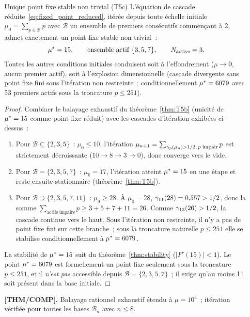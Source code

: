 \documentclass[12pt,a4paper]{article}
\begin{document}
\begin{thmbox}{Unique point fixe stable non trivial (T5c)}
\label{thm:T5c}
L'équation de cascade réduite~\eqref{eq:fixed_point_reduced}, itérée
depuis toute échelle initiale $\mu_0 = \sum_{p \in \mathcal{B}} p$
avec $\mathcal{B}$ un ensemble de premiers consécutifs commençant
à $2$, admet exactement un point fixe stable non trivial~:
\begin{equation}
  {\mu^{*}} = 15, \qquad
  \text{ensemble actif } \{3, 5, 7\}, \qquad
  N_{\rm active} = 3.
  \label{eq:unique_stable}
\end{equation}
Toutes les autres conditions initiales conduisent soit à
l'effondrement ($\mu \to 0$, aucun premier actif), soit à
l'explosion dimensionnelle (cascade divergente sans point fixe fini
sous l'itération non restreinte~; conditionnellement
${\mu^{*}} = 6079$ avec 53 premiers actifs sous la troncature
$p \leq 251$).

\begin{proof}
Combiner le balayage exhaustif du théorème~\ref{thm:T5b} (unicité de
${\mu^{*}} = 15$ comme point fixe réduit) avec les cascades d'itération
exhibées ci-dessus~:
\begin{enumerate}[nosep]
\item Pour $\mathcal{B} \subseteq \{2,3,5\}$~: $\mu_0 \leq 10$,
  l'itération
  $\mu_{n+1} = \sum_{\gamma_{p}(\mu_n) > 1/2,\, p \text{ impair}} p$
  est strictement décroissante ($10 \to 8 \to 3 \to 0$), donc
  converge vers le vide.
\item Pour $\mathcal{B} = \{2,3,5,7\}$~: $\mu_0 = 17$, l'itération
  atteint ${\mu^{*}} = 15$ en une étape et reste ensuite stationnaire
  (théorème~\ref{thm:T5b}).
\item Pour $\mathcal{B} \supseteq \{2,3,5,7,11\}$~: $\mu_0 \geq 28$.
  À $\mu_0 = 28$, $\gamma_{11}(28) = 0{,}557 > 1/2$, donc la somme
  $\sum_{\text{actifs impairs}} p \geq 3 + 5 + 7 + 11 = 26$. Comme
  $\gamma_{13}(26) > 1/2$, la cascade continue vers le haut. Sous
  l'itération non restreinte, il n'y a pas de point fixe fini sur
  cette branche~; sous la troncature naturelle $p \leq 251$ elle
  se stabilise conditionnellement à ${\mu^{*}} = 6079$.
\end{enumerate}
La stabilité de ${\mu^{*}} = 15$ suit du théorème~\ref{thm:stability}
($|F'(15)| < 1$). Le point ${\mu^{*}} = 6079$ est formellement un
point fixe seulement sous la troncature $p \leq 251$, et il \emph{n'est
pas} accessible depuis $\mathcal{B} = \{2,3,5,7\}$~; il exige qu'au
moins 11 soit présent dans la base initiale.
\end{proof}

\noindent\textbf{[THM/COMP].}\;
Balayage rationnel exhaustif étendu à $\mu = 10^4$~; itération
vérifiée pour toutes les bases $\mathcal{B}_n$ avec $n \leq 8$.
\end{thmbox}
\end{document}
